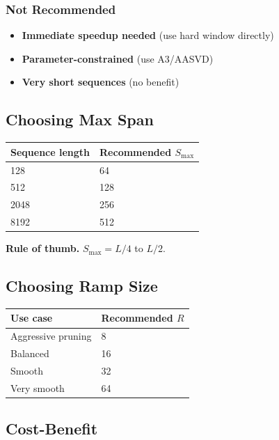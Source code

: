 \subsubsection{Not Recommended}

\begin{itemize}
\item \textbf{Immediate speedup needed} (use hard window directly)
\item \textbf{Parameter-constrained} (use A3/AASVD)
\item \textbf{Very short sequences} (no benefit)

\end{itemize}
\subsection{Choosing Max Span}

\begin{table}[H]
\centering
\small
\begin{tabular}{ll}
\toprule
\textbf{Sequence length} & \textbf{Recommended $S_\text{max}$} \\
\midrule
128 & 64 \\
512 & 128 \\
2048 & 256 \\
8192 & 512 \\
\bottomrule
\end{tabular}
\end{table}

\textbf{Rule of thumb.} $S_\text{max} = L / 4$ to $L / 2$.

\subsection{Choosing Ramp Size}

\begin{table}[H]
\centering
\small
\begin{tabular}{ll}
\toprule
\textbf{Use case} & \textbf{Recommended $R$} \\
\midrule
Aggressive pruning & 8 \\
Balanced & 16 \\
Smooth & 32 \\
Very smooth & 64 \\
\bottomrule
\end{tabular}
\end{table}

\subsection{Cost-Benefit}

